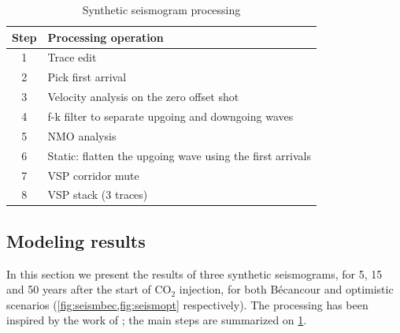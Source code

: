 \begin{table}
  \centering
  \caption{Synthetic seismogram processing}
\begin{tabular}{@{}cl@{}}
\toprule
 \textbf{Step} & \textbf{Processing operation}\\
\midrule
1   & Trace edit \\
2  & Pick first arrival  \\
3 & Velocity analysis on the zero offset shot\\
4  & f-k filter to separate upgoing and downgoing waves \\
5 & NMO analysis\\
6 & Static: flatten the upgoing wave using the first arrivals  \\
7 & VSP corridor mute\\
8 & VSP stack (3 traces)\\
 \bottomrule
\end{tabular}
\label{tbl:process}
\end{table}
\subsection{Modeling results}
In this section we present the results of three synthetic seismograms, for 5, 15
and 50 years after the start of CO$_2$ injection, for both B\'ecancour and
optimistic scenarios (\cref{fig:seismbec,fig:seismopt} respectively).
The processing has been inspired by the work of \citet{Coulombe1996,Zhang2010};
the main steps are summarized on \cref{tbl:process}.
